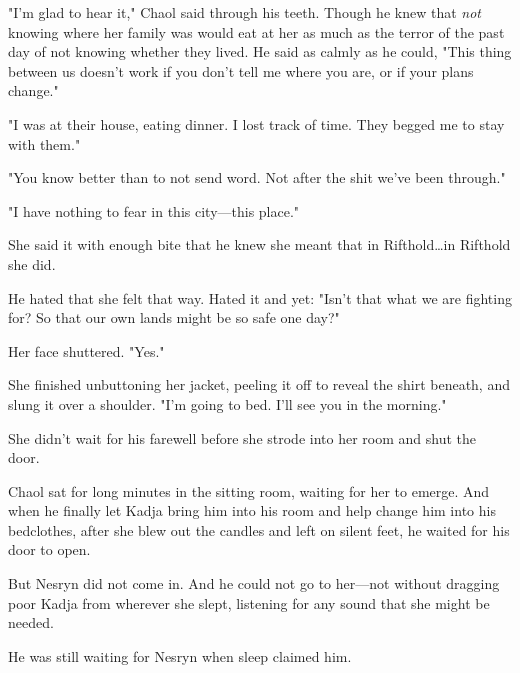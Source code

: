 "I'm glad to hear it," Chaol said through his teeth. Though he knew that \emph{not} knowing where her family was would eat at her as much as the terror of the past day of not knowing whether they lived. He said as calmly as he could, "This thing between us doesn't work if you don't tell me where you are, or if your plans change."

"I was at their house, eating dinner. I lost track of time. They begged me to stay with them."

"You know better than to not send word. Not after the shit we've been through."

"I have nothing to fear in this city---this place."

She said it with enough bite that he knew she meant that in Rifthold\dots in Rifthold she did.

He hated that she felt that way. Hated it and yet: "Isn't that what we are fighting for? So that our own lands might be so safe one day?"

Her face shuttered. "Yes."

She finished unbuttoning her jacket, peeling it off to reveal the shirt beneath, and slung it over a shoulder. "I'm going to bed. I'll see you in the morning."

She didn't wait for his farewell before she strode into her room and shut the door.

Chaol sat for long minutes in the sitting room, waiting for her to emerge. And when he finally let Kadja bring him into his room and help change him into his bedclothes, after she blew out the candles and left on silent feet, he waited for his door to open.

But Nesryn did not come in. And he could not go to her---not without dragging poor Kadja from wherever she slept, listening for any sound that she might be needed.

He was still waiting for Nesryn when sleep claimed him.

